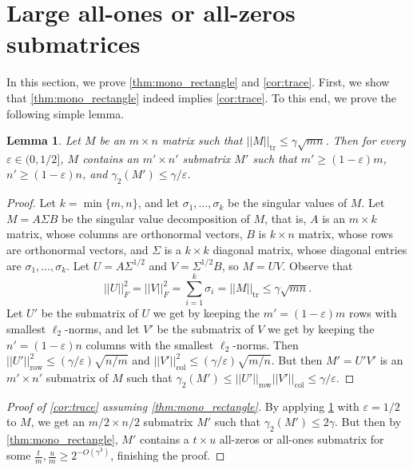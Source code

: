 \documentclass[11pt]{amsart}
\theoremstyle{plain}
\newtheorem{lemma}[theorem]{Lemma}
\theoremstyle{definition}
\DeclareMathOperator{\tr}{tr}
\DeclareMathOperator{\row}{row}
\DeclareMathOperator{\col}{col}
\begin{document}
\section{Large all-ones or all-zeros submatrices}\label{sect:mono_rectangle}

In this section, we prove \cref{thm:mono_rectangle} and \cref{cor:trace}. First, we show that  \cref{thm:mono_rectangle} indeed implies \cref{cor:trace}. To this end, we prove the following simple lemma.

\begin{lemma}\label{lemma:trace_to_gamma}
Let $M$ be an $m\times n$ matrix such that $||M||_{\tr}\leq \gamma \sqrt{mn}$. Then for every $\varepsilon\in (0,1/2]$, $M$ contains an $m'\times n'$ submatrix $M'$ such that $m'\geq (1-\varepsilon)m$, $n'\geq (1-\varepsilon)n$, and $\gamma_2(M')\leq \gamma/\varepsilon$.
\end{lemma}

\begin{proof}
Let $k=\min\{m,n\}$, and let $\sigma_1,\dots,\sigma_k$ be the singular values of $M$. Let $M=A\Sigma B$ be the singular value decomposition of $M$, that is, $A$ is an $m\times k$ matrix, whose columns are orthonormal vectors, $B$ is $k\times n$ matrix, whose rows are orthonormal vectors, and $\Sigma$ is a $k\times k$ diagonal matrix, whose diagonal entries are $\sigma_1,\dots,\sigma_{k}$. Let $U=A\Sigma^{1/2}$ and $V=\Sigma^{1/2} B$, so $M=UV$. Observe that $$||U||_F^2=||V||_F^2=\sum_{i=1}^k\sigma_i=||M||_{\tr}\leq \gamma \sqrt{mn}.$$ Let $U'$ be the submatrix of $U$ we get by keeping the $m'=(1-\varepsilon)m$ rows with smallest $\ell_2$-norms, and let $V'$ be the submatrix of $V$ we get by keeping the $n'=(1-\varepsilon) n$ columns with the smallest $\ell_2$-norms. Then $||U'||_{\row}^2\leq (\gamma/\varepsilon)\sqrt{n/m}$ and $||V'||_{\col}^2\leq (\gamma/\varepsilon)\sqrt{m/n}$. But then $M'=U'V'$ is an $m'\times n'$ submatrix of $M$ such that $\gamma_2(M')\leq ||U'||_{\row}||V'||_{\col}\leq \gamma/\varepsilon$. 
\end{proof}

\begin{proof}[Proof of \cref{cor:trace} assuming \cref{thm:mono_rectangle}]
By applying \cref{lemma:trace_to_gamma} with $\varepsilon=1/2$ to $M$, we get an $m/2\times n/2$ submatrix $M'$ such that $\gamma_2(M')\leq 2\gamma$. But then by \cref{thm:mono_rectangle}, $M'$ contains a $t\times u$ all-zeros or all-ones submatrix for some $\frac{t}{m},\frac{u}{m}\geq 2^{-O(\gamma^3)}$, finishing the proof.
\end{proof}
\end{document}
